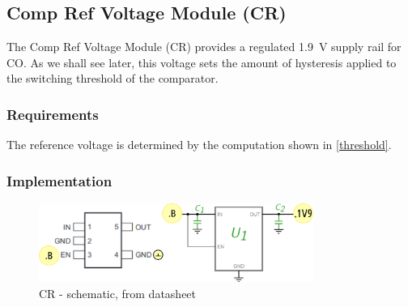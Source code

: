 \subsection{Comp Ref Voltage Module (CR) }
\label{sec:CR}

The Comp Ref Voltage Module (CR) provides a regulated \SI{1.9}{\volt} supply rail for CO.
As we shall see later, this voltage sets the amount of hysteresis applied to the switching
threshold of the comparator.


\subsubsection{Requirements}

The reference voltage is determined by the computation shown in \ref{threshold}.


\subsubsection{Implementation}


\begin{figure}[h]
    \centering
    \includegraphics[width=0.8\textwidth]{PO/CR/CR}
    \caption{CR - schematic, from datasheet \cite{noauthor_tps783xx_2014}}
\end{figure}







